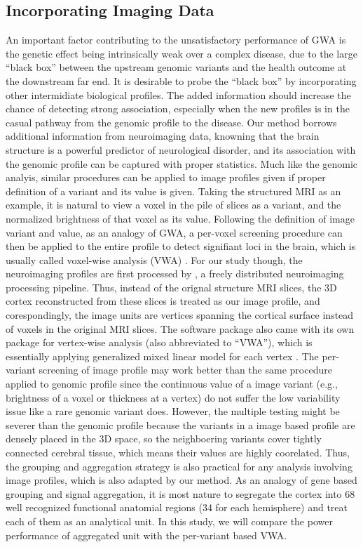 \subsection{Incorporating Imaging Data}
An important factor contributing to the unsatisfactory performance of GWA is the genetic effect being intrinsically weak over a complex disease, due to the large ``black box'' between the upstream genomic variants and the health outcome at the downstream far end. It is desirable to probe the ``black box'' by incorporating other intermidiate biological profiles. The added information should increase the chance of detecting strong association, especially when the new profiles is in the casual pathway from the genomic profile to the disease. Our method borrows additional information from neuroimaging data, knowning that the brain structure is a powerful predictor of neurological disorder, and its association with the genomic profile can be captured with proper statistics. Much like the genomic analyis, similar procedures can be applied to image profiles given if proper definition of a variant and its value is given. Taking the structured MRI as an example, it is natural to view a voxel in the pile of slices as a variant, and the normalized brightness of that voxel as its value. Following the definition of image variant and value, as an analogy of GWA, a per-voxel screening procedure can then be applied to the entire profile to detect signifiant loci in the brain, which is usually called voxel-wise analysis (VWA) \cite{VWA1, VWA2, VWA3, VWA4}. For our study though, the neuroimaging profiles are first processed by \FS, a freely distributed neuroimaging processing pipeline. Thus, instead of the orignal structure MRI slices, the 3D cortex reconstructed from these slices is treated as our image profile, and corespondingly, the image units are vertices spanning the cortical surface instead of voxels in the original MRI slices. The software package \FS also came with its own package for vertex-wise analysis (also abbreviated to ``VWA''), which is essentially applying generalized mixed linear model for each vertex \cite{FS:Anl1, FS:Anl2}. The per-variant screening of image profile may work better than the same procedure applied to genomic profile since the continuous value of a image variant (e.g., brightness of a voxel or thickness at a vertex) do not suffer the low variability issue like a rare genomic variant does. However, the multiple testing might be severer than the genomic profile because the variants in a image based profile are densely placed in the 3D space, so the neighboering variants cover tightly connected cerebral tissue, which means their values are highly coorelated. Thus, the grouping and aggregation strategy is also practical for any analysis involving image profiles, which is also adapted by our method. As an analogy of gene based grouping and signal aggregation, it is most nature to segregate the cortex into 68 well recognized functional anatomial regions (34 for each hemisphere) and treat each of them as an analytical unit. In this study, we will compare the power performance of aggregated unit with the per-variant based VWA.

